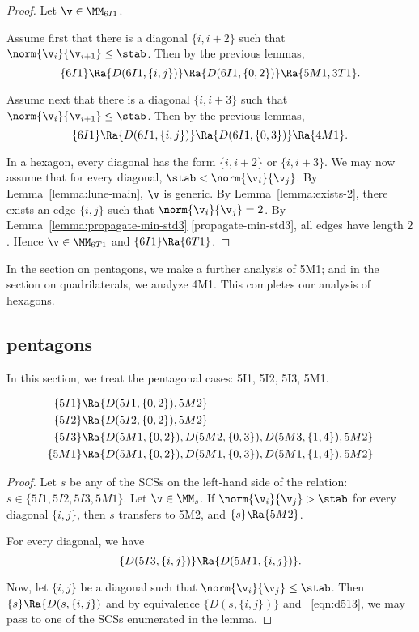 \begin{proof}
Let $\v\in \MM_{6I1}$.  

Assume first that there is a diagonal $\{i,i+2\}$ such that $\norm{\v_i}{\v_{i+1}}\le \stab$.
Then by the previous lemmas,
\[
\{6I1\}\Ra \{D(6I1,\{i,j\})\} \Ra \{D(6I1,\{0,2\})\} \Ra \{5M1,3T1\}.
\]

Assume next
that there is a diagonal $\{i,i+3\}$ such that $\norm{\v_i}{\v_{i+1}}\le \stab$.
Then by the previous lemmas,
\[
\{6I1\}\Ra \{D(6I1,\{i,j\})\} \Ra \{D(6I1,\{0,3\})\} \Ra \{4M1\}.
\]

In a hexagon, every diagonal has the form $\{i,i+2\}$ or $\{i,i+3\}$.  We may now assume that
for every diagonal, $\stab < \norm{\v_i}{\v_j}$.  By Lemma~\ref{lemma:lune-main}, $\v$ is generic.
By Lemma~\ref{lemma:exists-2}, there exists an edge $\{i,j\}$ such that $\norm{\v_i}{\v_j} = 2$.
By Lemma~\ref{lemma:propagate-min-std3} [propagate-min-std3], all edges have length $2$.
Hence $\v\in \MM_{6T1}$ and $\{6I1\}\Ra \{6T1\}$.
\end{proof}

In the section on pentagons, we make a further analysis of 5M1; and in the section on quadrilaterals, we analyze 4M1.
This completes our analysis of hexagons.  

\subsection{pentagons}

In this section, we treat the pentagonal cases: 5I1, 5I2, 5I3, 5M1.

\begin{lemma}[]
\begin{align*}
\{5I1\}&\Ra \{D(5I1,\{0,2\}),5M2\}\\
\{5I2\}&\Ra \{D(5I2,\{0,2\}),5M2\}\\
\{5I3\}&\Ra \{D(5M1,\{0,2\}),D(5M2,\{0,3\}),D(5M3,\{1,4\}),5M2\}\\
\{5M1\}&\Ra \{D(5M1,\{0,2\}),D(5M1,\{0,3\}),D(5M1,\{1,4\}),5M2\}\\
\end{align*}
\end{lemma}

\begin{proof}
Let $s$ be any of the SCSs on the left-hand side of the relation: $s\in \{5I1,5I2,5I3,5M1\}$.
Let $\v\in\MM_s$.  If $\norm{\v_i}{\v_j}>\stab$ for every diagonal $\{i,j\}$, then $s$ transfers to 5M2,
and $\{s\}\Ra \{5M2\}$.

For every diagonal,
we have 
\begin{equation}\label{eqn:d513}
\{D(5I3,\{i,j\})\}\Ra \{D(5M1,\{i,j\})\}.
\end{equation}

Now, let $\{i,j\}$ be a diagonal such that $\norm{\v_i}{\v_j}\le \stab$.  
Then $\{s\}\Ra \{D(s,\{i,j\})$ and by equivalence $\{D(s,\{i,j\})\}$ and ~\eqref{eqn:d513},
we may pass to one of the SCSs enumerated in the lemma.
\end{proof}

